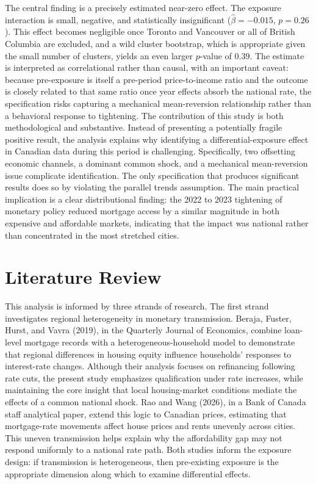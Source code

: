 \documentclass[12pt]{article}
\begin{document}
The central finding is a precisely estimated near-zero effect. The exposure interaction is small, negative, and statistically insignificant ($\hat{\beta}=-0.015$, $p=0.26$). This effect becomes negligible once Toronto and Vancouver or all of British Columbia are excluded, and a wild cluster bootstrap, which is appropriate given the small number of clusters, yields an even larger $p$-value of $0.39$. The estimate is interpreted as correlational rather than causal, with an important caveat: because pre-exposure is itself a pre-period price-to-income ratio and the outcome is closely related to that same ratio once year effects absorb the national rate, the specification risks capturing a mechanical mean-reversion relationship rather than a behavioral response to tightening. The contribution of this study is both methodological and substantive. Instead of presenting a potentially fragile positive result, the analysis explains why identifying a differential-exposure effect in Canadian data during this period is challenging. Specifically, two offsetting economic channels, a dominant common shock, and a mechanical mean-reversion issue complicate identification. The only specification that produces significant results does so by violating the parallel trends assumption. The main practical implication is a clear distributional finding: the 2022 to 2023 tightening of monetary policy reduced mortgage access by a similar magnitude in both expensive and affordable markets, indicating that the impact was national rather than concentrated in the most stretched cities.




\section{Literature Review}

This analysis is informed by three strands of research. The first strand investigates regional heterogeneity in monetary transmission. Beraja, Fuster, Hurst, and Vavra (2019), in the Quarterly Journal of Economics, combine loan-level mortgage records with a heterogeneous-household model to demonstrate that regional differences in housing equity influence households' responses to interest-rate changes. Although their analysis focuses on refinancing following rate cuts, the present study emphasizes qualification under rate increases, while maintaining the core insight that local housing-market conditions mediate the effects of a common national shock. Rao and Wang (2026), in a Bank of Canada staff analytical paper, extend this logic to Canadian prices, estimating that mortgage-rate movements affect house prices and rents unevenly across cities. This uneven transmission helps explain why the affordability gap may not respond uniformly to a national rate path. Both studies inform the exposure design: if transmission is heterogeneous, then pre-existing exposure is the appropriate dimension along which to examine differential effects.
\end{document}
